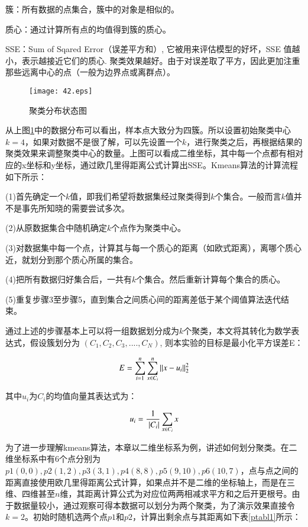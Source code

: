 簇：所有数据的点集合，簇中的对象是相似的。

质心：通过计算所有点的均值得到簇的质心。

SSE：Sum of Sqared Error（误差平方和）, 它被用来评估模型的好坏，SSE 值越小，表示越接近它们的质心. 聚类效果越好。由于对误差取了平方，因此更加注重那些远离中心的点（一般为边界点或离群点）。

\begin{figure}[H]
  \centering
  \texttt{[image: 42.eps]}
  \caption{聚类分布状态图}\label{42}
     \end{figure}

从上图\ref{42}中的数据分布可以看出，样本点大致分为四簇。所以设置初始聚类中心 $k=4$，如果对数据不是很了解，可以先设置一个$k$，进行聚类之后，再根据结果的聚类效果来调整聚类中心的数量。上图可以看成二维坐标，其中每一个点都有相对应的x坐标和y坐标，通过欧几里得距离公式计算出SSE。Kmeans算法的计算流程如下所示：

(1)首先确定一个$k$值，即我们希望将数据集经过聚类得到$k$个集合。一般而言$k$值并不是事先所知晓的需要尝试多次。

(2)从原数据集合中随机确定$k$个点作为聚类中心。

(3)对数据集中每一个点，计算其与每一个质心的距离（如欧式距离），离哪个质心近，就划分到那个质心所属的集合。

(4)把所有数据归好集合后，一共有$k$个集合。然后重新计算每个集合的质心。

(5)重复步骤3至步骤5，直到集合之间质心间的距离差低于某个阈值算法迭代结束。

通过上述的步骤基本上可以将一组数据划分成为$k$个聚类，本文将其转化为数学表达式，假设簇划分为 $(C_1,C_2,C_3,....,C_N)$, 则本实验的目标是最小化平方误差E：

\begin{equation}\label{emd}
\centering
      E=\sum_{i=1}^n\sum_{x\in C_i}^n||x-u_i||_2^2
               \end{equation}

其中$u_i$为$C_i$的均值向量其表达式为：

\begin{equation}\label{emd}
\centering
     u_i=\frac{1}{\ |C_i|}\sum_{x\in C_i}^{ }x
               \end{equation}

为了进一步理解kmeans算法，本章以二维坐标系为例，讲述如何划分聚类。在二维坐标系中有6个点分别为$p1(0,0),p2(1,2 ),p3(3,1),p4(8,8),p5(9,10),p6(10,7)$，点与点之间的距离直接使用欧几里得距离公式计算，如果点并不是二维的坐标轴上，而是在三维、四维甚至$n$维，其距离计算公式为对应位两两相减求平方和之后开更根号。由于数据量较小，通过观察可得本数据可以划分为两个聚类，为了演示效果直接令$k=2$。初始时随机选两个点$p1$和$p2$，计算出剩余点与其距离如下表\ref{ptabl1}所示：

